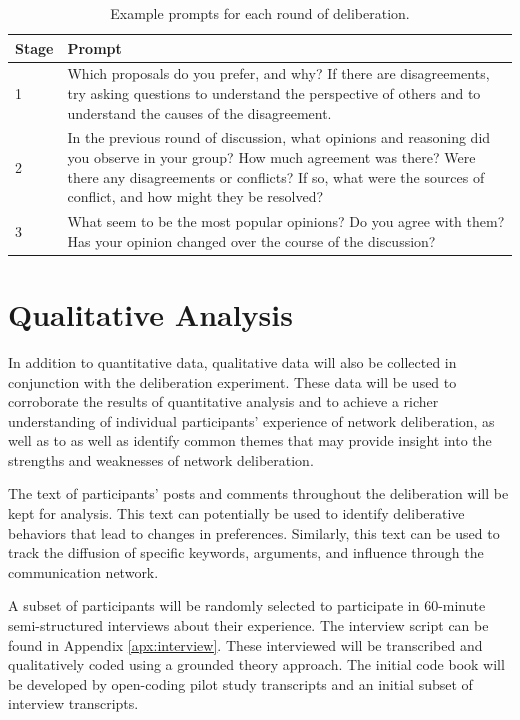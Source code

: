 \begin{table}
\center
\label{tab:prompts}
\begin{tabular}{|p{0.3in}|p{3.6in}|}
\hline
Stage & Prompt \\
\hline
1 &
Which proposals do you prefer, and why?
If there are disagreements, try asking questions to understand the perspective
of others and to understand the causes of the disagreement.
\\
\hline
2 & In the previous round of discussion, what opinions and reasoning did you
observe in your group?
How much agreement was there?
Were there any disagreements or conflicts?
If so, what were the sources of conflict, and how might they be resolved?
\\
\hline
3 &
What seem to be the most popular opinions?
Do you agree with them?
Has your opinion changed over the course of the discussion?
\\
\hline
\end{tabular}
\caption{Example prompts for each round of deliberation.}
\end{table}

\section{Qualitative Analysis}
In addition to quantitative data,
qualitative data will also be collected in conjunction with
the deliberation experiment.
These data will be used to corroborate the results of quantitative
analysis and to achieve a richer understanding of individual participants'
experience of network deliberation,
as well as to as well as identify common themes that may provide
insight into the strengths and weaknesses of network deliberation.

The text of participants' posts and comments throughout the deliberation
will be kept for analysis.
This text can potentially be used to identify deliberative behaviors that
lead to changes in preferences.
Similarly, this text can be used to track the diffusion of specific keywords,
arguments, and influence through the communication network.

A subset of participants will be randomly selected to participate in
60-minute semi-structured interviews about their experience.
The interview script can be found in Appendix \ref{apx:interview}.
These interviewed will be transcribed and qualitatively coded using a
grounded theory approach.
The initial code book will be developed by open-coding pilot study transcripts
and an initial subset of interview transcripts.


